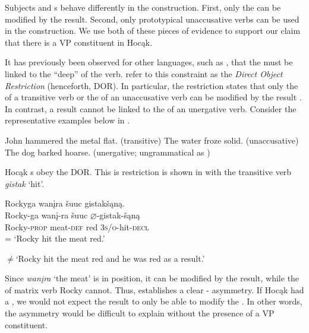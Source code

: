 \documentclass[output=paper]{LSP/langsci}
\begin{document}
Subjects and s behave differently in the  construction. First, only the  can be modified by the result. Second, only prototypical unaccusative verbs can be used in the  construction. We use both of these pieces of evidence to support our claim that there is a VP constituent in Hocąk.

It has previously been observed for other languages, such as , that the   must be linked to the ``deep''  of the verb.  \citet{LevinRappaportHovav1995} refer to this constraint as the \textit{Direct Object Restriction} (henceforth, DOR). In particular, the restriction states that only the  of a transitive verb or the  of an unaccusative verb can be modified by the result . In contrast, a result  cannot be linked to the  of an unergative verb. Consider the representative  examples below in .

\begin{exe}
\ex\label{ex:jrs:46}
\begin{xlist}
\ex John hammered the metal flat.	(transitive)
\ex The water froze solid.						(unaccusative)
\ex *The dog barked hoarse.	(unergative; ungrammatical as )
\end{xlist}
\end{exe}
	
Hocąk s obey the DOR. This is restriction is shown in  with the transitive verb \textit{gistak} `hit'.

\begin{exe}
\ex\label{ex:jrs:47} 
\glll Rockyga			wan\k{i}ra			\v{s}uuc 		gistak\v{s}ąną.\\
Rocky-ga		wan\k{i}-ra		\v{s}uuc		$\varnothing$-gistak-\v{s}ąną \\
Rocky-\textsc{prop}	meat-\textsc{def}	red			\textsc{3s/o}-hit-\textsc{decl} \\
\trans = `Rocky hit the meat red.'

$\neq$`Rocky hit the meat red and he was red as a result.'
\end{exe}

Since \textit{wan\k{i}ra} `the meat' is in  position, it can be modified by the result, while the  of matrix verb Rocky cannot. Thus,  establishes a clear - asymmetry. If Hocąk had a , we would not expect the result to only be able to modify the . In other words, the asymmetry would be difficult to explain without the presence of a VP constituent.
	
\end{document}

